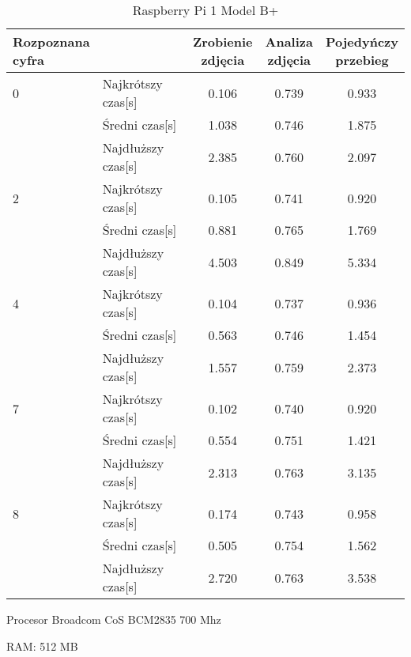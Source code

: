 \begin{table}[H]
    \centering
    \begin{threeparttable}
        \caption{Raspberry Pi 1 Model B+}
        \begin{tabular}{|l|l|ccc|}
            \toprule
            \thead{Rozpoznana \\ cyfra} & & \thead{Zrobienie \\ zdjęcia} &
            \thead{Analiza \\ zdjęcia} & \thead{Pojedyńczy \\ przebieg} \\
            \midrule
            0 & Najkrótszy czas[s] & 0.106 & 0.739 & 0.933 \\
            & Średni czas[s] & 1.038 & 0.746 & 1.875 \\
            & Najdłuższy czas[s] & 2.385 & 0.760 & 2.097 \\
            \midrule
            2 & Najkrótszy czas[s] & 0.105 & 0.741 & 0.920 \\
            & Średni czas[s] & 0.881 & 0.765 & 1.769 \\
            & Najdłuższy czas[s] & 4.503 & 0.849 & 5.334 \\
            \midrule
            4 & Najkrótszy czas[s] & 0.104 & 0.737 & 0.936 \\
            & Średni czas[s] & 0.563 & 0.746 & 1.454 \\
            & Najdłuższy czas[s] & 1.557 & 0.759 & 2.373 \\
            \midrule
            7 & Najkrótszy czas[s] & 0.102 & 0.740 & 0.920 \\
            & Średni czas[s] & 0.554 & 0.751 & 1.421 \\
            & Najdłuższy czas[s] & 2.313 & 0.763 & 3.135 \\
            \midrule
            8 & Najkrótszy czas[s] & 0.174 & 0.743 & 0.958 \\
            & Średni czas[s] & 0.505 & 0.754 & 1.562 \\
            & Najdłuższy czas[s] & 2.720 & 0.763 & 3.538 \\
            \bottomrule
        \end{tabular}
        \begin{tablenotes}
            \item Procesor Broadcom CoS BCM2835 700 Mhz
            \item RAM: 512 MB
        \end{tablenotes}
    \end{threeparttable}
\end{table}

